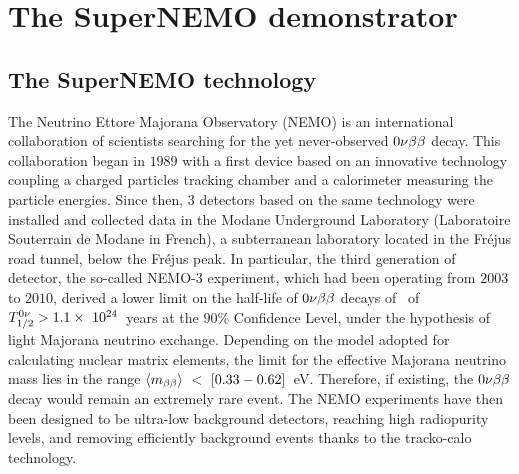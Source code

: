 \chapter{The SuperNEMO demonstrator}
\label{ch:detector}


\section{The SuperNEMO technology}

The Neutrino Ettore Majorana Observatory (NEMO) is an international collaboration of scientists searching for the yet never-observed $0\nu\beta\beta$ decay.
This collaboration began in $1989$ with a first device based on an innovative technology coupling a charged particles tracking chamber and a calorimeter measuring the particle energies.
Since then, $3$ detectors based on the same technology were installed and collected data in the Modane Underground Laboratory (Laboratoire Souterrain de Modane in French), a subterranean laboratory located in the Fréjus road tunnel, below the Fréjus peak.
In particular, the third generation of detector, the so-called NEMO-$3$ experiment, which had been operating from $2003$ to $2010$, derived a lower limit on the half-life of $0\nu\beta\beta$ decays of \Mo\ of $T_{1/2}^{0\nu}>1.1\times~10^{24}$~years at the $90$\% Confidence Level, under the hypothesis of light Majorana neutrino exchange.
Depending on the model adopted for calculating nuclear matrix elements, the limit for the effective Majorana neutrino mass lies in the range $\langle m_{\beta\beta}\rangle~<~[0.33-0.62]$~eV.
Therefore, if existing, the $0\nu\beta\beta$ decay would remain an extremely rare event.
The NEMO experiments have then been designed to be ultra-low background detectors, reaching high radiopurity levels, and removing efficiently background events thanks to the tracko-calo technology.

